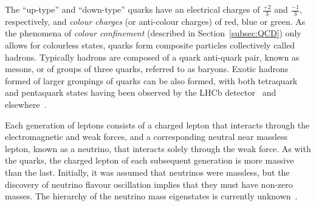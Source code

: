 The ``up-type'' and ``down-type'' quarks have an electrical charges of $\frac{+2}{3}$ and $\frac{-1}{3}$,  respectively, and \emph{colour charges} (or anti-colour charges) of red, blue or green.
As the phenomena of \emph{colour confinement} (described in Section~\ref{subsec:QCD}) only allows for colourless states, quarks form composite particles collectively called hadrons.
Typically hadrons are composed of a quark anti-quark pair, known as mesons, or of groups of three quarks, referred to as baryons.
Exotic hadrons formed of larger groupings of quarks can be also formed, with both tetraquark and pentaquark states having been observed by the LHCb detector~\cite{Aaij:2014jqa,Aaij:2015tga} and elsewhere~\cite{Tanabashi:2018oca}.

Each generation of leptons consists of a charged lepton that interacts through the electromagnetic and weak forces, and a corresponding neutral near massless lepton, known as a neutrino, that interacts solely through the weak force.
As with the quarks, the charged lepton of each subsequent generation is more massive than the last.
Initially, it was assumed that neutrinos were massless, but the discovery of neutrino flavour oscillation implies that they must have non-zero masses. 
The hierarchy of the neutrino mass eigenstates is currently unknown~\cite{Nath:2018rqn}.

